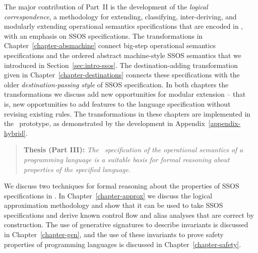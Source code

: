 \noindent
The major contribution of Part~II is the development of the {\it
  logical correspondence}, a methodology for extending, classifying,
inter-deriving, and modularly extending operational semantics
specifications that are encoded in \sls, with an emphasis on SSOS
specifications. The transformations in
Chapter~\ref{chapter-absmachine} connect big-step operational
semantics specifications and the ordered abstract machine-style SSOS
semantics that we introduced in Section~\ref{sec:intro-ssos}. The
destination-adding transformation given in
Chapter~\ref{chapter-destinations} connects these specifications with
the older {\it destination-passing style} of SSOS specification. In
both chapters the transformations we discuss 
add new opportunities for modular extension -- that is,
new opportunities to add features to the language specification without
revising existing rules. The transformations in these chapters are
implemented in the \sls~prototype, as demonstrated by the development
in Appendix~\ref{appendix-hybrid}.

\smallskip
\begin{quote} 
  {\bf Thesis (Part III):} {\it The \sls~specification of the operational
    semantics of a programming language is a suitable basis for formal
    reasoning about properties of the specified language.}
\end{quote} 
\smallskip 

\noindent
We discuss two techniques for formal reasoning about the properties of
SSOS specifications in \sls. In Chapter~\ref{chapter-approx} we
discuss the logical approximation methodology and show that it can be
used to take SSOS specifications and derive known control flow and
alias analyses that are correct by construction.  The use of
generative signatures to describe invariants is discussed in
Chapter~\ref{chapter-gen}, and the use of these invariants to prove
safety properties of programming languages is discussed in
Chapter~\ref{chapter-safety}. 
